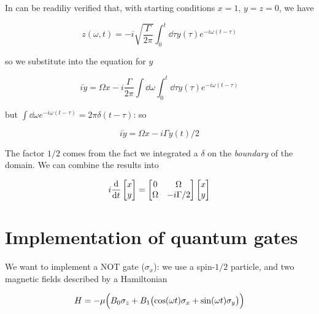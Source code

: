 \documentclass[main.tex]{subfiles}
\begin{document}
In can be readiliy verified that, with starting conditions \(x=1\), \(y=z=0\), we have

\begin{equation}
    z(\omega, t) = -i \sqrt{\frac{\Gamma}{2 \pi}} \int _{0}   ^{t} \dd{\tau} y(\tau) e^{-i \omega (t-\tau)}
\end{equation}

so we substitute into the equation for \(y\)

\begin{equation}
    i \dot{y} = \Omega x  -i\frac{\Gamma}{2 \pi} \int \dd{\omega} \int _{0}   ^{t} \dd{\tau} y(\tau) e^{-i \omega (t-\tau)}
\end{equation}

but \(\int   \dd{\omega} e^{-i \omega (t- \tau)} = 2 \pi \delta(t- \tau)\): so

\begin{equation}
    i \dot{y} = \Omega x  -i\Gamma y(t) /2
\end{equation}

The factor \(1/2\) comes from the fact we integrated a \(\delta\) on the \emph{boundary} of the domain.
We can combine the results into

\begin{equation}
    i \dv{}{t} \begin{bmatrix}
    x \\
    y
\end{bmatrix}
    = \begin{bmatrix}
    0   & \Omega     \\
     \Omega  & -i \Gamma /2
 \end{bmatrix}
    \begin{bmatrix}
    x \\
    y
\end{bmatrix}
\end{equation}

\section{Implementation of quantum gates}

We want to implement a NOT gate (\(\sigma_x\)): we use a spin-$1/2$ particle, and two magnetic fields described by  a Hamiltonian

\begin{equation}
    H = - \mu \qty(B_0 \sigma_z + B_1 \qty(\cos(\omega t) \sigma_x + \sin(\omega t)\sigma_y  ))
\end{equation}
\end{document}
